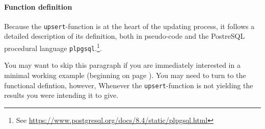 \paragraph{Function definition}

Because the \texttt{upsert}-function is at the heart of the updating process, it follows a detailed description of its definition, both in pseudo-code and the PostreSQL procedural language \texttt{plpgsql}.\footnote{See \url{https://www.postgresql.org/docs/8.4/static/plpgsql.html}}.

You may want to skip this paragraph if you are immediately interested in a minimal working example (beginning on page \pageref{par_upsert_minimal_working_example}). 
You may need to turn to the functional defintion, however, Whenever the \texttt{upsert}-function is not yielding the results you were intending it to give.

